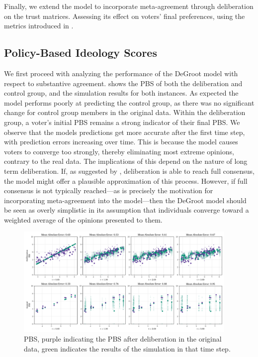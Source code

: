 
Finally, we extend the model to incorporate meta-agreement through deliberation on the trust matrices. Assessing its effect on voters’ final preferences, using the metrics introduced in .

\subsection{Policy-Based Ideology Scores}

We first proceed with analyzing the performance of the DeGroot model with
respect to substantive agreement.  shows the PBS of both the
deliberation and control group, and the simulation results for both instances.
As expected the model performs poorly at predicting the control group, as there
was no significant change for control group members in the original data.
Within the deliberation group, a voter's initial PBS remains a strong indicator
of their final PBS. We observe that the models predictions get more accurate
after the first time step, with prediction errors increasing over time. This is
because the model causes voters to converge too strongly, thereby eliminating
most extreme opinions, contrary to the real data. The implications of this
depend on the nature of long term deliberation. If, as suggested by
\citet{elsterMARKETFORUMThree2002}, deliberation is able to reach full
consensus, the model might offer a plausible approximation of this process.
However, if full consensus is not typically reached—as is precisely the
motivation for incorporating meta-agreement into the model—then the DeGroot
model should be seen as overly simplistic in its assumption that individuals
converge toward a weighted average of the opinions presented to them.

\begin{figure}[ht]
	\begin{center}
		\includegraphics[width=0.95\textwidth]{Figures/pbs_scores.png}
	\end{center}
	\caption{ PBS, purple indicating the PBS after deliberation in the original data, green indicates the results of the simulation in that time step.}\label{fig:pbs}
\end{figure}

